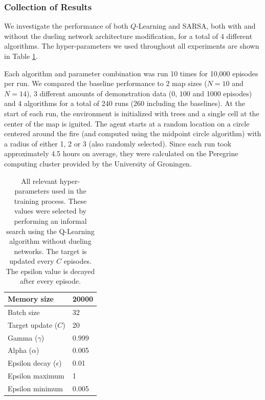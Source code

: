 \subsubsection{Collection of Results}\label{sec:datacollection}
We investigate the performance of both $Q$-Learning and SARSA, both with and without the dueling network architecture modification, for a total of 4 different algorithms. The hyper-parameters we used throughout all experiments are shown in Table \ref{tab:hyperparameters}.

Each algorithm and parameter combination was run 10 times for 10,000 episodes per run. We compared the baseline performance to 2 map sizes ($N=10$ and $N=14$), 3 different amounts of demonstration data (0, 100 and 1000 episodes) and 4 algorithms for a total of 240 runs (260 including the baselines). At the start of each run, the environment is initialized with trees and a single cell at the center of the map is ignited. The agent starts at a random location on a circle centered around the fire (and computed using the midpoint circle algorithm) with a radius of either 1, 2 or 3 (also randomly selected). Since each run took approximately 4.5 hours on average, they were calculated on the Peregrine computing cluster provided by the University of Groningen.

\begin{table}[H]
\centering
\begin{tabular}{|l|l|}
\hline
Memory size & 20000 \\ \hline
Batch size & 32 \\ \hline
Target update ($C$) & 20 \\ \hline
Gamma ($\gamma$) & 0.999 \\ \hline
Alpha ($\alpha$) & 0.005 \\ \hline
Epsilon decay ($\epsilon$) & 0.01 \\ \hline
Epsilon maximum & 1 \\ \hline
Epsilon minimum & 0.005 \\ \hline
\end{tabular}
\caption{All relevant hyper-parameters used in the training process. These values were selected by performing an informal search using the Q-Learning algorithm without dueling networks. The target is updated every $C$ episodes. The epsilon value is decayed after every episode.}
\label{tab:hyperparameters}
\end{table}
